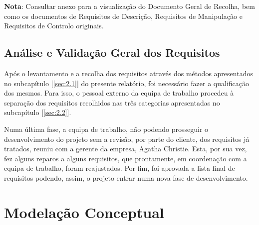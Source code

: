 \documentclass[a4paper,12pt]{scrreprt}
\begin{document}

        \textbf{Nota}: Consultar anexo \textit{} para a visualização do Documento Geral de Recolha, bem como os documentos de Requisitos de Descrição, Requisitos de Manipulação e Requisitos de Controlo originais.
        
    \section{Análise e Validação Geral dos Requisitos}
        
        Após o levantamento e a recolha dos requisitos através dos métodos apresentados no subcapítulo [\ref{sec:2.1}] do presente relatório, foi necessário fazer a qualificação dos mesmos. Para isso, o pessoal externo da equipa de trabalho procedeu à separação dos requisitos recolhidos nas três categorias apresentadas no subcapítulo [\ref{sec:2.2}].
        
        Numa última fase, a equipa de trabalho, não podendo prosseguir o desenvolvimento do projeto sem a revisão, por parte do cliente, dos requisitos já tratados, reuniu com a gerente da empresa, Agatha Christie. Esta, por sua vez, fez alguns reparos a alguns requisitos, que prontamente, em coordenação com a equipa de trabalho, foram reajustados. Por fim, foi aprovada a lista final de requisitos podendo, assim, o projeto entrar numa nova fase de desenvolvimento.



\chapter{Modelação Conceptual}
\end{document}
